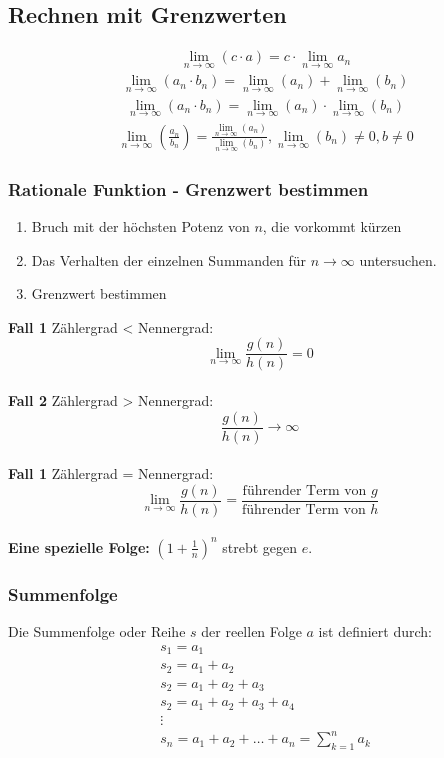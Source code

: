 \subsection{Rechnen mit Grenzwerten}
\begin{align}
    &\lim_{n \rightarrow \infty}(c \cdot a) = c \cdot \lim_{n \rightarrow \infty} a_n
\end{align}
\begin{align}
    &\lim_{n \to \infty} (a_n \cdot b_n) = \lim_{n \to \infty} (a_n) + \lim_{n \to \infty} (b_n)
\end{align}
\begin{align}
    &\lim_{n \to \infty} (a_n \cdot b_n) = \lim_{n \to \infty} (a_n) \cdot \lim_{n \to \infty} (b_n)
\end{align}
\begin{align}
    &\lim_{n \to \infty} (\frac{a_n}{b_n}) = \frac{\lim_{n \to \infty} (a_n)}{\lim_{n \to \infty} (b_n)}, \lim_{n \to \infty}(b_n) \neq 0, b \neq 0
\end{align}

\vfill

\subsubsection{Rationale Funktion - Grenzwert bestimmen}
\begin{enumerate}
    \item Bruch mit der höchsten Potenz von $n$, die vorkommt kürzen
    \item Das Verhalten der einzelnen Summanden für $n \to \infty$ untersuchen.
    \item Grenzwert bestimmen
\end{enumerate}

\textbf{Fall 1 } Zählergrad < Nennergrad: \[\lim_{n \to \infty} \frac{g(n)}{h(n)} = 0\] \\
\textbf{Fall 2 } Zählergrad > Nennergrad: \[\frac{g(n)}{h(n)} \to \infty \] \\
\textbf{Fall 1 } Zählergrad = Nennergrad: \[\lim_{n \to \infty} \frac{g(n)}{h(n)} = \frac{\text{führender Term von }g}{\text{führender Term von } h}\] \\

\textbf{Eine spezielle Folge: } $(1+\frac{1}{n})^n$ strebt gegen $e$.

\subsubsection{Summenfolge}
Die Summenfolge oder Reihe $s$ der reellen Folge $a$ ist definiert durch:
\begin{align*}
    &s_1 = a_1 \\
    &s_2 = a_1 + a_2\\
    &s_2 = a_1 + a_2 + a_3\\
    &s_2 = a_1 + a_2 + a_3 + a_4\\
    &\vdots \\
    &s_n = a_1 + a_2 + \dots + a_n = \sum_{k=1}^{n}a_k
\end{align*}

